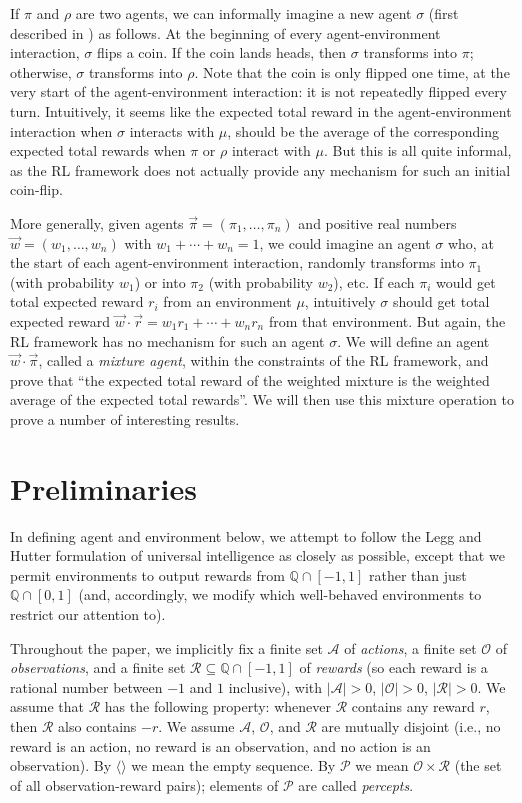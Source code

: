 \documentclass[twoside]{article}
\begin{document}
If $\pi$ and $\rho$ are two agents, we can informally imagine a new agent
$\sigma$ (first described in \cite{alexander2021reward})
as follows. At the beginning of every agent-environment interaction,
$\sigma$ flips a coin. If the coin lands heads, then $\sigma$ transforms into
$\pi$; otherwise, $\sigma$ transforms into $\rho$. Note that the coin is only
flipped one time, at the very start of the agent-environment interaction:
it is not repeatedly flipped every turn. Intuitively, it seems like the
expected total reward in the agent-environment interaction
when $\sigma$ interacts with $\mu$, should be the average
of the corresponding expected total rewards when $\pi$ or $\rho$ interact
with $\mu$. But this is all quite informal, as the RL
framework does not actually provide any mechanism for such an initial
coin-flip.

More generally, given agents $\vec{\pi}=(\pi_1,\ldots,\pi_n)$ and positive real
numbers
$\vec{w}=(w_1,\ldots,w_n)$ with $w_1+\cdots+w_n=1$, we could imagine an agent $\sigma$
who, at the start of each agent-environment interaction, randomly transforms
into $\pi_1$ (with probability $w_1$) or into $\pi_2$ (with probability $w_2$),
etc. If each $\pi_i$ would get total expected reward $r_i$ from an environment
$\mu$, intuitively $\sigma$ should get total expected reward
$\vec{w}\cdot \vec{r}=w_1r_1+\cdots+w_nr_n$ from that environment.
But again, the RL
framework has no mechanism for such an agent $\sigma$. We will define
an agent $\vec{w}\cdot\vec{\pi}$, called a \emph{mixture agent},
within the constraints
of the RL framework, and prove that ``the expected total reward of the
weighted mixture is the weighted average of the expected total rewards''.
We will then use this mixture operation to prove a number of interesting results.

\section{Preliminaries}

In defining agent and environment below, we attempt to follow
the Legg and Hutter formulation of universal intelligence \cite{legg2007universal} as closely as possible,
except that we permit environments to output rewards from $\mathbb Q \cap [-1,1]$
rather than just $\mathbb Q\cap [0,1]$ (and, accordingly, we modify which well-behaved
environments to restrict our attention to).

Throughout the paper, we implicitly
fix a finite set $\mathcal A$ of \emph{actions},
a finite set $\mathcal O$ of \emph{observations},
and a finite set $\mathcal R\subseteq \mathbb Q\cap [-1,1]$ of \emph{rewards}
(so each reward is a rational number between $-1$ and $1$ inclusive),
with $|\mathcal A|>0$,
$|\mathcal O|>0$, $|\mathcal R|>0$.
We assume that $\mathcal R$ has the following property:
whenever $\mathcal R$ contains any reward $r$, then $\mathcal R$
also contains $-r$.
We assume $\mathcal A$, $\mathcal O$, and $\mathcal R$ are mutually disjoint
(i.e., no reward is an action, no reward is an observation, and no action is an
observation).
By $\langle\rangle$ we mean the empty sequence.
By $\mathcal P$ we mean $\mathcal O\times\mathcal R$ (the set of all observation-reward
pairs); elements of $\mathcal P$ are called \emph{percepts}.
\end{document}
